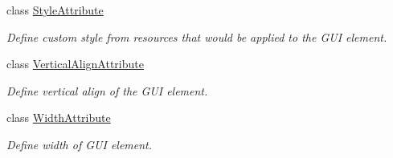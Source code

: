 \begin{DoxyCompactItemize}
class \mbox{\hyperlink{class_wpf_handler_1_1_u_i_1_1_auto_layout_1_1_options_1_1_style_attribute}{Style\+Attribute}}
\begin{DoxyCompactList}\small\item\em Define custom style from resources that would be applied to the G\+UI element. \end{DoxyCompactList}\item 
class \mbox{\hyperlink{class_wpf_handler_1_1_u_i_1_1_auto_layout_1_1_options_1_1_vertical_align_attribute}{Vertical\+Align\+Attribute}}
\begin{DoxyCompactList}\small\item\em Define vertical align of the G\+UI element. \end{DoxyCompactList}\item 
class \mbox{\hyperlink{class_wpf_handler_1_1_u_i_1_1_auto_layout_1_1_options_1_1_width_attribute}{Width\+Attribute}}
\begin{DoxyCompactList}\small\item\em Define width of G\+UI element. \end{DoxyCompactList}\end{DoxyCompactItemize}
